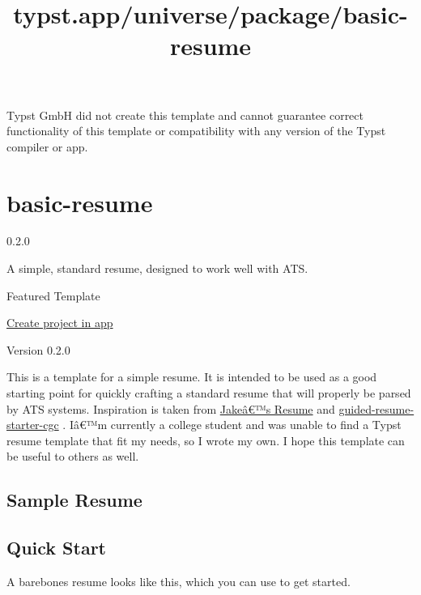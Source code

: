 Typst GmbH did not create this template and cannot guarantee correct
functionality of this template or compatibility with any version of the
Typst compiler or app.


\title{typst.app/universe/package/basic-resume}

\label{banner}
\label{template-thumbnail}

\section{basic-resume}\label{basic-resume}

{ 0.2.0 }

A simple, standard resume, designed to work well with ATS.

{ } Featured Template

\href{/app?template=basic-resume&version=0.2.0}{Create project in app}

\label{readme}
Version 0.2.0

This is a template for a simple resume. It is intended to be used as a
good starting point for quickly crafting a standard resume that will
properly be parsed by ATS systems. Inspiration is taken from
\href{https://github.com/jakegut/resume}{Jakeâ€™s Resume} and
\href{https://typst.app/universe/package/guided-resume-starter-cgc/}{guided-resume-starter-cgc}
. Iâ€™m currently a college student and was unable to find a Typst
resume template that fit my needs, so I wrote my own. I hope this
template can be useful to others as well.

\subsection{Sample Resume}\label{sample-resume}


\subsection{Quick Start}\label{quick-start}

A barebones resume looks like this, which you can use to get started.


